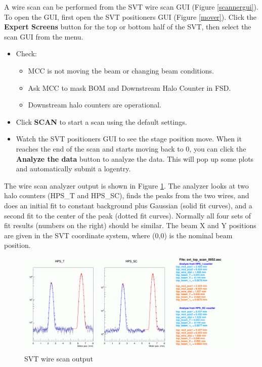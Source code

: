 \documentclass[12pt]{report}
\begin{document}
A wire scan can be performed from the SVT wire scan GUI (Figure \ref{scannergui}). To open the GUI, first open the SVT positioners GUI (Figure \ref{mover}). Click the \textbf{Expert Screens} button for the top or bottom half of the SVT, then select the scan GUI from the menu.

\begin{itemize}
\item Check:
\begin{itemize}
\item
MCC is not moving the beam or changing beam conditions.
\item
Ask MCC to mask BOM and Downstream Halo Counter in FSD.
\item
Downstream halo counters are operational.
\end{itemize}
\item
Click \textbf{SCAN} to start a scan using the default settings.
\item
Watch the SVT positioners GUI to see the stage position move. When it reaches the end of the scan and starts moving back to 0, you can click the \textbf{Analyze the data} button to analyze the data. This will pop up some plots and automatically submit a logentry.
\end{itemize}

The wire scan analyzer output is shown in Figure \ref{scanneroutput}. The analyzer looks at two halo counters (HPS\_T and HPS\_SC), finds the peaks from the two wires, and does an initial fit to constant background plus Gaussian (solid fit curves), and a second fit to the center of the peak (dotted fit curves). Normally all four sets of fit results (numbers on the right) should be similar. The beam X and Y positions are given in the SVT coordinate system, where (0,0) is the nominal beam position.

\begin{figure}[ht!]
\centering
\includegraphics[width=\textwidth]{svt_wirescan_output}
\caption{SVT wire scan output}
\label{scanneroutput}
\end{figure}
\end{document}

